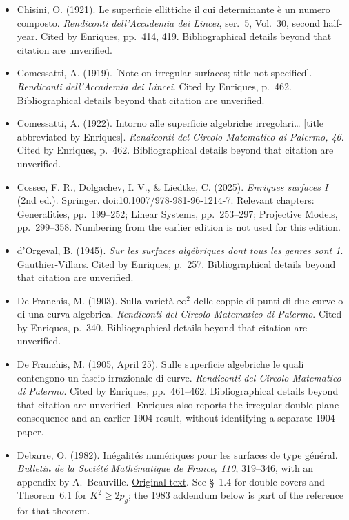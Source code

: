 \begin{sloppypar}
\begin{itemize}
\item Chisini, O. (1921). Le superficie ellittiche il cui determinante è un numero composto. \emph{Rendiconti dell'Accademia dei Lincei}, ser.~5, Vol.~30, second half-year. Cited by Enriques, pp.~414, 419. Bibliographical details beyond that citation are unverified.

\item Comessatti, A. (1919). [Note on irregular surfaces; title not specified]. \emph{Rendiconti dell'Accademia dei Lincei}. Cited by Enriques, p.~462. Bibliographical details beyond that citation are unverified.

\item Comessatti, A. (1922). Intorno alle superficie algebriche irregolari\ldots{} [title abbreviated by Enriques]. \emph{Rendiconti del Circolo Matematico di Palermo, 46}. Cited by Enriques, p.~462. Bibliographical details beyond that citation are unverified.

\item Cossec, F. R., Dolgachev, I. V., \& Liedtke, C. (2025). \emph{Enriques surfaces I} (2nd ed.). Springer. \href{https://doi.org/10.1007/978-981-96-1214-7}{doi:10.1007/978-981-96-1214-7}. Relevant chapters: Generalities, pp.~199--252; Linear Systems, pp.~253--297; Projective Models, pp.~299--358. Numbering from the earlier edition is not used for this edition.

\item d'Orgeval, B. (1945). \emph{Sur les surfaces algébriques dont tous les genres sont 1}. Gauthier-Villars. Cited by Enriques, p.~257. Bibliographical details beyond that citation are unverified.

\item De Franchis, M. (1903). Sulla varietà $\infty^2$ delle coppie di punti di due curve o di una curva algebrica. \emph{Rendiconti del Circolo Matematico di Palermo}. Cited by Enriques, p.~340. Bibliographical details beyond that citation are unverified.

\item De Franchis, M. (1905, April 25). Sulle superficie algebriche le quali contengono un fascio irrazionale di curve. \emph{Rendiconti del Circolo Matematico di Palermo}. Cited by Enriques, pp.~461--462. Bibliographical details beyond that citation are unverified. Enriques also reports the irregular-double-plane consequence and an earlier 1904 result, without identifying a separate 1904 paper.

\item Debarre, O. (1982). Inégalités numériques pour les surfaces de type général. \emph{Bulletin de la Société Mathématique de France, 110}, 319--346, with an appendix by A.~Beauville. \href{https://www.numdam.org/article/BSMF_1982__110__319_0.pdf}{Original text}. See \S~1.4 for double covers and Theorem~6.1 for $K^2\geq2p_g$; the 1983 addendum below is part of the reference for that theorem.


\end{itemize}
\end{sloppypar}
